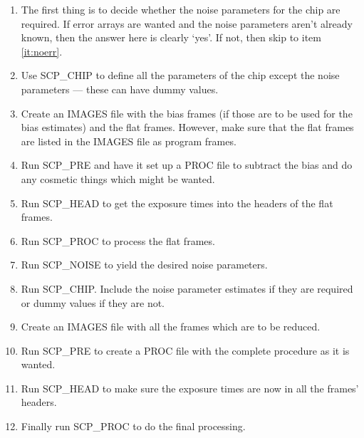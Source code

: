 \begin{enumerate}

\item The first thing is to decide whether the noise parameters for the chip
are required. If error arrays are wanted and the noise parameters aren't
already known, then the answer here is clearly `yes'. If not, then skip to
item \ref{it:noerr}.

\item Use SCP\_CHIP to define all the parameters of the chip except the noise
parameters --- these can have dummy values.

\item Create an IMAGES file with the bias frames (if those are  to be used for
the bias estimates) and the flat frames. However, make sure that the flat
frames are listed in the IMAGES file as program frames.

\item Run SCP\_PRE and have it set up a PROC file to subtract the bias and do
any cosmetic things which might be wanted.

\item Run SCP\_HEAD to get the exposure times into the headers of the flat
frames.

\item Run SCP\_PROC to process the flat frames.

\item Run SCP\_NOISE to yield the desired noise parameters.

\item \label{it:noerr} Run SCP\_CHIP. Include the noise parameter estimates if
they are required or dummy values if they are not.

\item Create an IMAGES file with all the frames which are to be reduced.

\item Run SCP\_PRE to create a PROC file with the complete procedure as  it is
wanted.

\item Run SCP\_HEAD to make sure the exposure times are now in all the
frames' headers.

\item Finally run SCP\_PROC to do the final processing.

\end{enumerate}


